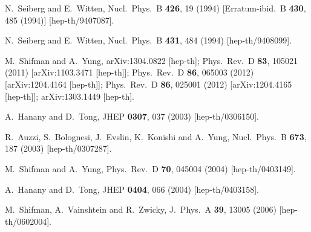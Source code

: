 \documentclass[12pt]{article}
\begin{document}
\begin{thebibliography}{99}
  N.~Seiberg and E.~Witten,
  Nucl.\ Phys.\ B {\bf 426}, 19 (1994)
  [Erratum-ibid.\ B {\bf 430}, 485 (1994)]
  [hep-th/9407087].

  N.~Seiberg and E.~Witten,
  Nucl.\ Phys.\ B {\bf 431}, 484 (1994)
  [hep-th/9408099].

  M.~Shifman and A.~Yung,
  arXiv:1304.0822 [hep-th];
  Phys.\ Rev.\ D {\bf 83}, 105021 (2011)
  [arXiv:1103.3471 [hep-th]];
  Phys.\ Rev.\ D {\bf 86}, 065003 (2012)
  [arXiv:1204.4164 [hep-th]];
  Phys.\ Rev.\ D {\bf 86}, 025001 (2012)
  [arXiv:1204.4165 [hep-th]];
  arXiv:1303.1449 [hep-th].
  
A.~Hanany and D.~Tong,
JHEP {\bf 0307}, 037 (2003)
[hep-th/0306150].

R.~Auzzi, S.~Bolognesi, J.~Evslin, K.~Konishi and A.~Yung,
Nucl.\ Phys.\ B {\bf 673}, 187 (2003)
[hep-th/0307287].

M.~Shifman and A.~Yung,
Phys.\ Rev.\ D {\bf 70}, 045004 (2004)
[hep-th/0403149].

A.~Hanany and D.~Tong,
JHEP {\bf 0404}, 066 (2004)
[hep-th/0403158].

  
  M.~Shifman, A.~Vainshtein and R.~Zwicky,
  J.\ Phys.\ A {\bf 39}, 13005 (2006)
  [hep-th/0602004].


\end{thebibliography}
\end{document}
